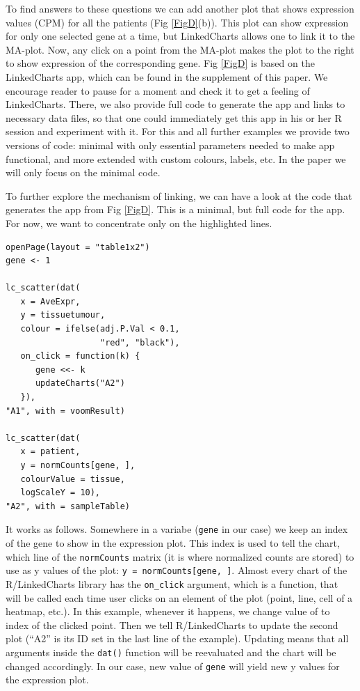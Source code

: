 \documentclass[twocolumn,10pt]{article}
\begin{document}
To find answers to these questions we can add another plot that shows expression values (CPM) for all the patients (Fig \ref{FigD}(b)). This plot can show expression for only one selected gene at a time, but LinkedCharts allows one to link it to the MA-plot. Now, any click on a point from the MA-plot makes the plot to the right to show expression of the corresponding gene. Fig \ref{FigD} is based on the LinkedCharts app, which can be found in the supplement of this paper. We encourage reader to pause for a moment and check it to get a feeling of LinkedCharts. There, we also provide full code to generate the app and links to necessary data files, so that one could immediately get this app in his or her R session and experiment with it. For this and all further examples we provide two versions of code: minimal with only essential parameters needed to make app functional, and more extended with custom colours, labels, etc. In the paper we will only focus on the minimal code.

To further explore the mechanism of linking, we can have a look at the code that generates the app from Fig \ref{FigD}. This is a minimal, but full code for the app. For now, we want to concentrate only on the highlighted lines.

\begin{verbatim}
openPage(layout = "table1x2")
gene <- 1

lc_scatter(dat(
   x = AveExpr,
   y = tissuetumour,
   colour = ifelse(adj.P.Val < 0.1, 
                   "red", "black"),
   on_click = function(k) {
      gene <<- k
      updateCharts("A2")
   }),
"A1", with = voomResult)

lc_scatter(dat(
   x = patient,
   y = normCounts[gene, ],
   colourValue = tissue, 
   logScaleY = 10),
"A2", with = sampleTable)
\end{verbatim}

It works as follows. Somewhere in a variabe (\texttt{gene} in our case) we keep an index of the gene to show in the expression plot. This index is used to tell the chart, which line of the \texttt{normCounts} matrix (it is where normalized counts are stored) to use as y values of the plot: \texttt{y = normCounts[gene, ]}. Almost every chart of the R/LinkedCharts library has the \texttt{on_click} argument, which is a function, that will be called each time user clicks on an element of the plot (point, line, cell of a heatmap, etc.). In this example, whenever it happens, we change value of  to index of the clicked point. Then we tell R/LinkedCharts to update the second plot (``A2'' is its ID set in the last line of the example). Updating means that all arguments inside the \texttt{dat()} function will be reevaluated and the chart will be changed accordingly. In our case, new value of \texttt{gene} will yield new y values for the expression plot.
\end{document}
